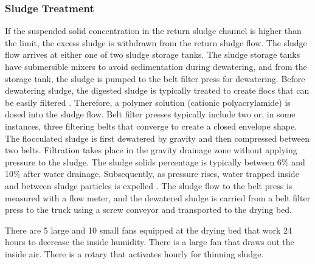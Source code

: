 \subsubsection{Sludge Treatment}
If the suspended solid concentration in the return sludge channel is higher than the limit, the excess sludge is withdrawn from the return sludge flow. The sludge flow arrives at either one of two sludge storage tanks. The sludge storage tanks have submersible mixers to avoid sedimentation during dewatering, and from the storage tank, the sludge is pumped to the belt filter press for dewatering. Before dewatering sludge, the digested sludge is typically treated to create flocs that can be easily filtered \cite{Chen2002}. Therefore, a polymer solution (cationic polyacrylamide) is dosed into the sludge flow. Belt filter presses typically include two or, in some instances, three filtering belts that converge to create a closed envelope shape. The flocculated sludge is first dewatered by gravity and then compressed between two belts. Filtration takes place in the gravity drainage zone without applying pressure to the sludge. The sludge solids percentage is typically between 6\% and 10\% after water drainage. Subsequently, as pressure rises, water trapped inside and between sludge particles is expelled \cite{Mamais2009}. The sludge flow to the belt press is measured with a flow meter, and the dewatered sludge is carried from a belt filter press to the truck using a screw conveyor and transported to the drying bed.





There are 5 large and 10 small fans equipped at the drying bed that work 24 hours to decrease the inside humidity. There is a large fan that draws out the inside air. There is a rotary that activates hourly for thinning sludge.

